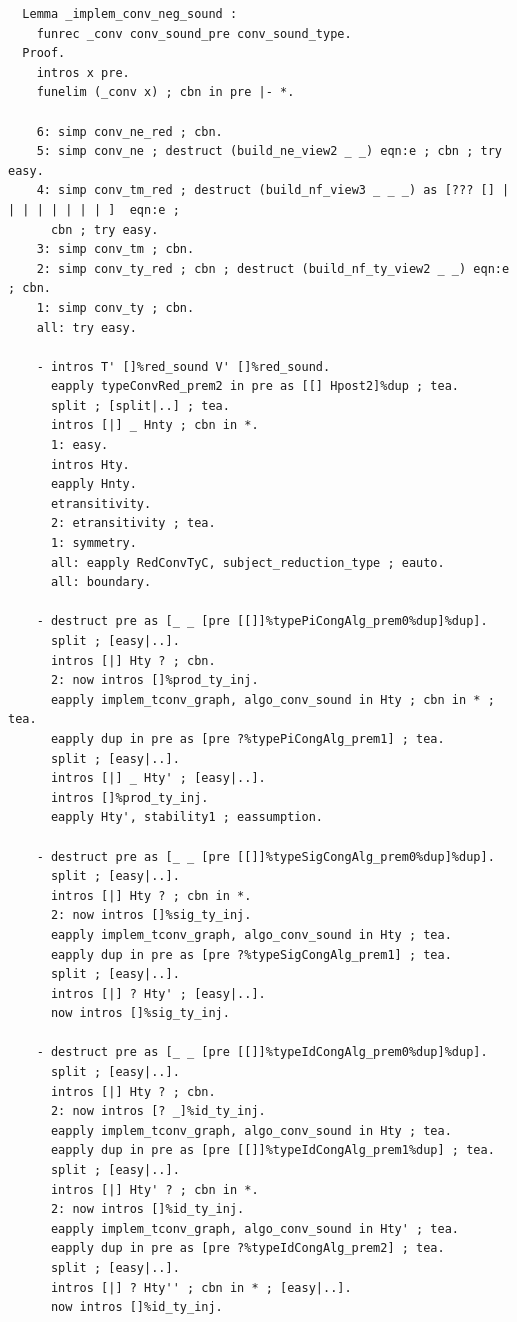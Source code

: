 \documentclass[10pt,a4paper]{amsart}
\begin{document}
\begin{lstlisting}
  Lemma _implem_conv_neg_sound :
    funrec _conv conv_sound_pre conv_sound_type.
  Proof.
    intros x pre.
    funelim (_conv x) ; cbn in pre |- *.
    
    6: simp conv_ne_red ; cbn.
    5: simp conv_ne ; destruct (build_ne_view2 _ _) eqn:e ; cbn ; try easy.
    4: simp conv_tm_red ; destruct (build_nf_view3 _ _ _) as [??? [] | | | | | | | | ]  eqn:e ;
      cbn ; try easy.
    3: simp conv_tm ; cbn.
    2: simp conv_ty_red ; cbn ; destruct (build_nf_ty_view2 _ _) eqn:e ; cbn.
    1: simp conv_ty ; cbn.
    all: try easy.
    
    - intros T' []%red_sound V' []%red_sound.
      eapply typeConvRed_prem2 in pre as [[] Hpost2]%dup ; tea.
      split ; [split|..] ; tea.
      intros [|] _ Hnty ; cbn in *.
      1: easy.
      intros Hty.
      eapply Hnty.
      etransitivity.
      2: etransitivity ; tea.
      1: symmetry. 
      all: eapply RedConvTyC, subject_reduction_type ; eauto.
      all: boundary.

    - destruct pre as [_ _ [pre [[]]%typePiCongAlg_prem0%dup]%dup].
      split ; [easy|..].
      intros [|] Hty ? ; cbn.
      2: now intros []%prod_ty_inj.
      eapply implem_tconv_graph, algo_conv_sound in Hty ; cbn in * ; tea.
      eapply dup in pre as [pre ?%typePiCongAlg_prem1] ; tea.
      split ; [easy|..].
      intros [|] _ Hty' ; [easy|..].
      intros []%prod_ty_inj.
      eapply Hty', stability1 ; eassumption.

    - destruct pre as [_ _ [pre [[]]%typeSigCongAlg_prem0%dup]%dup].
      split ; [easy|..].
      intros [|] Hty ? ; cbn in *.
      2: now intros []%sig_ty_inj.
      eapply implem_tconv_graph, algo_conv_sound in Hty ; tea.
      eapply dup in pre as [pre ?%typeSigCongAlg_prem1] ; tea.
      split ; [easy|..].
      intros [|] ? Hty' ; [easy|..].
      now intros []%sig_ty_inj.
    
    - destruct pre as [_ _ [pre [[]]%typeIdCongAlg_prem0%dup]%dup].
      split ; [easy|..].
      intros [|] Hty ? ; cbn.
      2: now intros [? _]%id_ty_inj.
      eapply implem_tconv_graph, algo_conv_sound in Hty ; tea.
      eapply dup in pre as [pre [[]]%typeIdCongAlg_prem1%dup] ; tea.
      split ; [easy|..].
      intros [|] Hty' ? ; cbn in *.
      2: now intros []%id_ty_inj.
      eapply implem_tconv_graph, algo_conv_sound in Hty' ; tea.
      eapply dup in pre as [pre ?%typeIdCongAlg_prem2] ; tea.
      split ; [easy|..].
      intros [|] ? Hty'' ; cbn in * ; [easy|..].
      now intros []%id_ty_inj.


\end{lstlisting}
\end{document}
